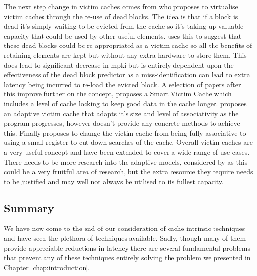 The next step change in victim caches comes from \citet{khanUsingDeadBlocks2010} who proposes to virtualise victim caches through the re-use of dead blocks. The idea is that if a block is dead it's simply waiting to be evicted from the cache so it's taking up valuable capacity that could be used by other useful elements. \citeauthor{khanUsingDeadBlocks2010} uses this to suggest that these dead-blocks could be re-appropriated as a victim cache so all the benefits of retaining elements are kept but without any extra hardware to store them. This does lead to significant decrease in \gls{mpki} but is entirely dependent upon the effectiveness of the dead block predictor as a miss-identification can lead to extra latency being incurred to re-load the evicted block. A selection of papers after this improve further on the concept, \citet{asaduzzamanEffectiveLockingfreeCaching2014} proposes a Smart Victim Cache which includes a level of cache locking to keep good data in the cache longer. \citet{navarroAdaptiveVictimCache2014} proposes an adaptive victim cache that adapts it's size and level of associativity as the program progresses, however doesn't provide any concrete methods to achieve this. Finally \citet{subhaArchitectureVictimCache2016} proposes to change the victim cache from being fully associative to using a small register to cut down searches of the cache. Overall victim caches are a very useful concept and have been extended to cover a wide range of use-cases. There needs to be more research into the adaptive models, considered by \citet{navarroAdaptiveVictimCache2014} as this could be a very fruitful area of research, but the extra resource they require needs to be justified and may well not always be utilised to its fullest capacity.

\subsection{Summary}
We have now come to the end of our consideration of cache intrinsic techniques and have seen the plethora of techniques available. Sadly, though many of them provide appreciable reductions in latency there are several fundamental problems that prevent any of these techniques entirely solving the problem we presented in Chapter \ref{chap:introduction}. 

